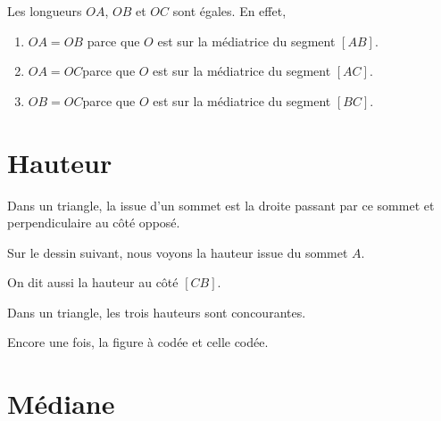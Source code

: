 Les longueurs \( OA\), \( OB\) et \( OC\) sont égales. En effet,
\begin{enumerate}
    \item
        \( OA=OB\) parce que \( O\) est sur la médiatrice du segment \( [AB]\).
    \item
        \( OA=OC\)parce que \( O\) est sur la médiatrice du segment \( [AC]\).
    \item
        \( OB=OC\)parce que \( O\) est sur la médiatrice du segment \( [BC]\).
\end{enumerate}

\section{Hauteur}

\begin{definition}
    Dans un triangle, la  issue d'un sommet est la droite passant par ce sommet et perpendiculaire au côté opposé.
\end{definition}

Sur le dessin suivant, nous voyons la hauteur issue du sommet \( A\).

\begin{center}
   
\end{center}
On dit aussi la hauteur  au côté \( [CB]\).

\begin{propriete}
    Dans un triangle, les trois hauteurs sont concourantes.
\end{propriete}

Encore une fois, la figure à codée et celle codée.
\begin{center}
   \hfill
   
\end{center}

\section{Médiane}

